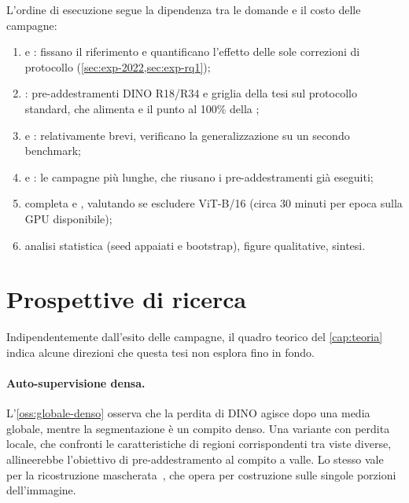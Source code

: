 L'ordine di esecuzione segue la dipendenza tra le domande e il costo delle campagne:

\begin{enumerate}
  \item {} e : fissano il riferimento e quantificano
  l'effetto delle sole correzioni di protocollo (\cref{sec:exp-2022,sec:exp-rq1});
  \item {}: pre-addestramenti DINO R18/R34 e griglia della tesi sul protocollo
  standard, che alimenta  e il punto al 100\% della ;
  \item {} e : relativamente brevi, verificano la
  generalizzazione su un secondo benchmark;
  \item {} e : le campagne più lunghe, che riusano i
  pre-addestramenti già eseguiti;
  \item {} completa e , valutando se escludere
  ViT-B/16 (circa 30 minuti per epoca sulla GPU disponibile);
  \item analisi statistica (seed appaiati e bootstrap), figure qualitative, sintesi.
\end{enumerate}


\section{Prospettive di ricerca}
\label{sec:prospettive-ricerca}

Indipendentemente dall'esito delle campagne, il quadro teorico del \cref{cap:teoria} indica
alcune direzioni che questa tesi non esplora fino in fondo.

\paragraph{Auto-supervisione densa.}
L'\cref{oss:globale-denso} osserva che la perdita di DINO agisce dopo una media globale, mentre
la segmentazione è un compito denso. Una variante con perdita locale, che confronti le
caratteristiche di regioni corrispondenti tra viste diverse, allineerebbe l'obiettivo di
pre-addestramento al compito a valle. Lo stesso vale per la ricostruzione
mascherata~\cite{he2022mae,cong2022satmae}, che opera per costruzione sulle singole porzioni
dell'immagine.

